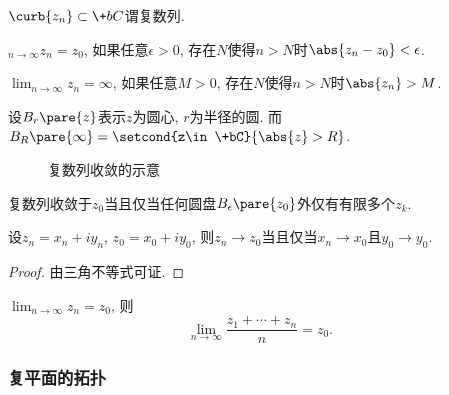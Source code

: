 \documentclass{ctexart}
\begin{document}
\begin{definition}[复数列]
    $\curb{z_n}\subset \+bC$谓复数列.
\end{definition}
\begin{definition}[复数列的收敛]
    $\displaystyle_{n\rightarrow\infty} z_n = z_0$, 如果任意$\epsilon>0$, 存在$N$使得$n>N$时$\abs{z_n - z_0} < \epsilon$.
    \par
    $\displaystyle\lim_{n\rightarrow\infty} z_n = \infty$, 如果任意$M>0$, 存在$N$使得$n>N$时$\abs{z_n} > M$.
\end{definition}
设$B_r\pare{z}$表示$z$为圆心, $r$为半径的圆. 而$B_R\pare{\infty} = \setcond{z\in\+bC}{\abs{z}>R}$.
\begin{figure}[ht]
    \centering
    \caption{复数列收敛的示意}
\end{figure}
\begin{lemma}
    复数列收敛于$z_0$当且仅当任何圆盘$B_\epsilon\pare{z_0}$外仅有有限多个$z_k$.
\end{lemma}
\begin{theorem}
    设$z_n = x_n + iy_n$, $z_0 = x_0+iy_0$, 则$z_n\rightarrow z_0$当且仅当$x_n\rightarrow x_0$且$y_0\rightarrow y_0$.
\end{theorem}
\begin{proof}
    由三角不等式可证.
\end{proof}
\begin{sample}
    \begin{ex}
        $\displaystyle \lim_{n\rightarrow\infty} z_n = z_0$, 则
        \[ \lim_{n\rightarrow\infty} \frac{z_1 + \cdots + z_n}{n} = z_0. \]
    \end{ex}
\end{sample}


\subsubsection{复平面的拓扑} %
\label{ssub:复平面的拓扑}
\end{document}
